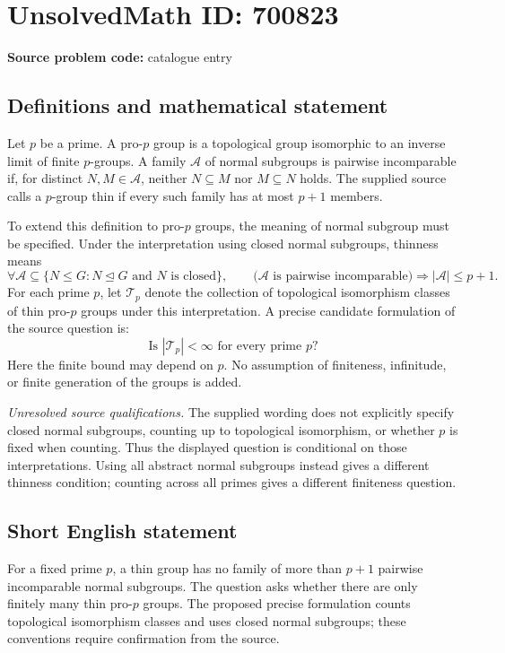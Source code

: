 \documentclass[11pt]{article}
\begin{document}
\section*{UnsolvedMath ID: 700823}
\textbf{Source problem code:} catalogue entry
\subsection{Definitions and mathematical statement}
Let \(p\) be a prime. A pro-\(p\) group is a topological group isomorphic to an inverse limit of finite \(p\)-groups. A family \(\mathcal A\) of normal subgroups is pairwise incomparable if, for distinct \(N,M\in\mathcal A\), neither \(N\subseteq M\) nor \(M\subseteq N\) holds. The supplied source calls a \(p\)-group thin if every such family has at most \(p+1\) members.

To extend this definition to pro-\(p\) groups, the meaning of normal subgroup must be specified. Under the interpretation using closed normal subgroups, thinness means
\[
\forall\mathcal A\subseteq\{N\leq G:N\trianglelefteq G\text{ and }N\text{ is closed}\},\qquad
\bigl(\mathcal A\text{ is pairwise incomparable}\bigr)\Longrightarrow |\mathcal A|\leq p+1.
\]
For each prime \(p\), let \(\mathcal T_p\) denote the collection of topological isomorphism classes of thin pro-\(p\) groups under this interpretation. A precise candidate formulation of the source question is:
\[
\text{Is }|\mathcal T_p|<\infty\text{ for every prime }p?
\]
Here the finite bound may depend on \(p\). No assumption of finiteness, infinitude, or finite generation of the groups is added.

\emph{Unresolved source qualifications.} The supplied wording does not explicitly specify closed normal subgroups, counting up to topological isomorphism, or whether \(p\) is fixed when counting. Thus the displayed question is conditional on those interpretations. Using all abstract normal subgroups instead gives a different thinness condition; counting across all primes gives a different finiteness question.
\subsection{Short English statement}
For a fixed prime \(p\), a thin group has no family of more than \(p+1\) pairwise incomparable normal subgroups. The question asks whether there are only finitely many thin pro-\(p\) groups. The proposed precise formulation counts topological isomorphism classes and uses closed normal subgroups; these conventions require confirmation from the source.
\end{document}
